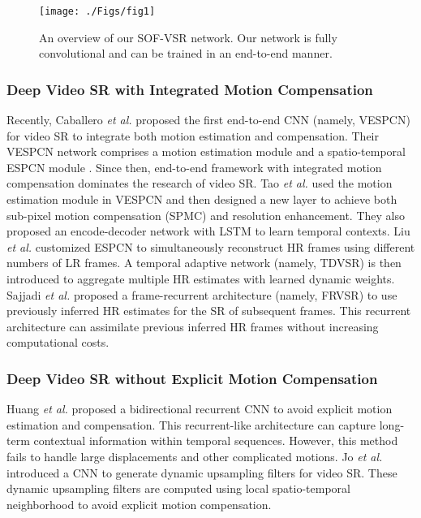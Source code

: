 \documentclass[journal]{IEEEtran}
\begin{document}
	\begin{figure*}[ht]
		\centering
		\texttt{[image: ./Figs/fig1]}
		\caption{An overview of our SOF-VSR network. Our network is fully convolutional and can be trained in an end-to-end manner.}
		\label{fig1}
	\end{figure*}
	
	\subsubsection{Deep Video SR with Integrated Motion Compensation} 
	Recently, Caballero \emph{et al.} \cite{2017-RealTimeVideoSuperResolutionwithSpatioTemporalNetworksandMotionCompensation-Caballero-2848-2857} proposed the first end-to-end CNN (namely, VESPCN) for video SR to integrate both motion estimation and compensation. Their VESPCN network comprises a motion estimation module and a spatio-temporal ESPCN module \cite{2016-RealTimeSingleImageandVideoSuperResolutionUsinganEfficientSubPixelConvolutionalNeuralNetwork-Shi-1874-1883}. Since then, end-to-end framework with integrated motion compensation
	dominates the research of video SR. 
	Tao \emph{et al.} \cite{2017-DetailRevealingDeepVideoSuperResolution-Tao-4482-4490}
	used the motion estimation module in VESPCN and then designed a new layer to achieve both sub-pixel motion compensation (SPMC) and resolution enhancement. They also proposed an encode-decoder network with LSTM to learn temporal contexts.
	Liu \emph{et al.} \cite{2017-RobustVideoSuperResolutionwithLearnedTemporalDynamics-Liu--} customized ESPCN \cite{2016-RealTimeSingleImageandVideoSuperResolutionUsinganEfficientSubPixelConvolutionalNeuralNetwork-Shi-1874-1883} to
	simultaneously reconstruct HR frames using different numbers of LR frames. A temporal adaptive network (namely, TDVSR) is then introduced to aggregate multiple HR estimates with learned dynamic weights. 
	Sajjadi \emph{et al.} \cite{2018-FrameRecurrentVideoSuperResolution-Sajjadi-6626-6634} proposed a frame-recurrent architecture (namely, FRVSR) to use previously inferred HR estimates for the SR of subsequent frames. This recurrent architecture can assimilate previous inferred HR frames without increasing computational costs.
	
	\subsubsection{Deep Video SR without Explicit Motion Compensation} 
	Huang \emph{et al.} \cite{2017-VideoSuperResolutionandViaBidirectionalandRecurrentConvolutionalandNetworks-Huang-1-1} proposed a bidirectional recurrent CNN to avoid explicit motion estimation and compensation. This recurrent-like architecture can capture long-term contextual information within temporal sequences. However, this method fails to handle large displacements and other complicated motions. Jo \emph{et al.} \cite{2018-DeepVideoSuperResolutionNetworkUsingDynamicUpsamplingFilterswithoutExplicitMotionCompensation-Jo--} introduced a CNN to generate dynamic upsampling filters for video SR. These dynamic upsampling filters are computed using local spatio-temporal neighborhood to avoid explicit motion compensation.
	
\end{document}
